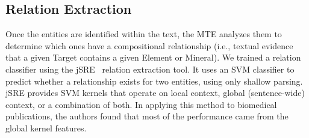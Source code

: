 \documentclass[letterpaper]{article} %
\begin{document}


\subsection{Relation Extraction}

Once the entities are identified within the text, the MTE analyzes them
to determine which ones have a compositional relationship (i.e.,
textual evidence that a given Target contains a given Element or
Mineral).  
%
We trained a relation classifier using the jSRE~\cite{giuliano:jsre06}
relation extraction tool.  It uses an SVM classifier to predict
whether a relationship exists for two entities, using only shallow
parsing.  jSRE provides SVM kernels that operate on local context,
global (sentence-wide) context, or a combination of both.  In applying
this method to biomedical publications, the authors found that most of
the performance came from the global kernel features.
\end{document}
